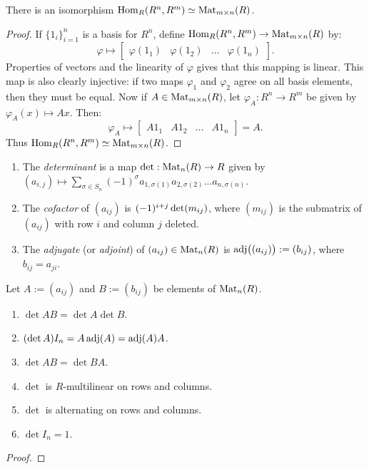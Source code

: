 \begin{proposition}\label{prop:hom-isom-mat}
	There is an isomorphism $\operatorname{Hom}_R(R^n,R^m) \simeq \operatorname{Mat}_{m \times n}(R)$.
\end{proposition}
	\begin{proof}
		If $\{1_i\}_{i = 1}^n$ is a basis for $R^n$, define $\operatorname{Hom}_R(R^n,R^m) \rightarrow \operatorname{Mat}_{m \times n}(R)$ by: $$\varphi \mapsto \begin{bmatrix} \varphi(1_1) & \varphi(1_2) & \ldots &\varphi(1_n) \end{bmatrix}.$$ Properties of vectors and the linearity of $\varphi$ gives that this mapping is linear. This map is also clearly injective: if two maps $\varphi_1$ and $\varphi_2$ agree on all basis elements, then they must be equal. Now if $A \in \operatorname{Mat}_{m \times n}(R)$, let $\varphi_A:R^n \rightarrow R^m$ be given by $\varphi_A(x) \mapsto Ax$. Then:
		\[
			\varphi_A \mapsto \begin{bmatrix} A 1_1 & A 1_2 & \ldots & A 1_n \end{bmatrix} = A.
		\] 
		Thus $\operatorname{Hom}_R(R^n,R^m)\simeq \operatorname{Mat}_{m \times n}(R)$.
	\end{proof}

\begin{definition}
	\mbox{}
	\begin{enumerate}[label = (\arabic*),itemsep=1pt,topsep=3pt]
		\item The \emph{determinant} is a map $\det:\operatorname{Mat}_n(R) \rightarrow R$ given by $(a_{i,j}) \mapsto \sum_{\sigma \in S_n}^{}(-1)^\sigma a_{1,\sigma(1)}a_{2,\sigma(2)}\ldots a_{n,\sigma(n)}$.
		\item The \emph{cofactor} of $(a_{ij})$ is $(-1)^{i + j}\operatorname{det} (m_{ij})$, where $(m_{ij})$ is the submatrix of $(a_{ij})$ with row $i$ and column $j$ deleted.
		\item The \emph{adjugate} (or \emph{adjoint}) of $(a_{ij})\in \operatorname{Mat}_n(R)$ is $\operatorname{adj}\bigl( (a_{ij}) \bigr) := (b_{ij})$, where $b_{ij} = a_{ji}$.
	\end{enumerate}
\end{definition}

\begin{proposition}
	Let $A := (a_{ij})$ and $B := (b_{ij})$ be elements of $\operatorname{Mat}_n(R)$.
	\mbox{}
	\begin{enumerate}[label = (\arabic*),itemsep=1pt,topsep=3pt]
		\item $\det AB = \det A \det B$.
		\item $(\det A)I_n = A \operatorname{adj}(A) = \operatorname{adj}(A)A$.
		\item $\det AB = \det BA$.
		\item $\det$ is $R$-multilinear on rows and columns.
		\item $\det$ is alternating on rows and columns.
		\item $\det I_n = 1$.
	\end{enumerate}
\end{proposition}
	{\color{red}
	\begin{proof}
			
	\end{proof}}

